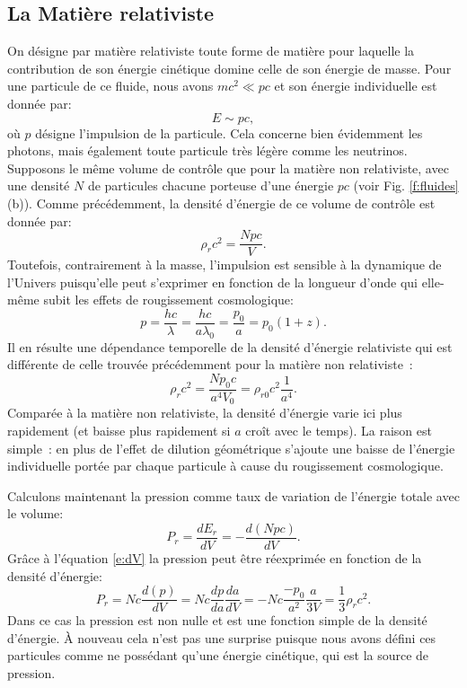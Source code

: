 \subsection{La Matière relativiste}
On désigne par matière relativiste toute forme de matière pour laquelle la contribution de son énergie cinétique domine celle de son énergie de masse. Pour une particule de ce fluide, nous avons $mc^2\ll pc$ et son énergie individuelle est donnée par:
\begin{equation}
E\sim pc,
\end{equation}
où $p$ désigne l'impulsion de la particule. Cela concerne bien évidemment les photons, mais également toute particule très légère comme les neutrinos. Supposons le même volume de contrôle que pour la matière non relativiste, avec une densité $N$ de particules chacune porteuse d'une énergie $pc$ (voir Fig. \ref{f:fluides} (b)). Comme précédemment, la densité d'énergie de ce volume de contrôle est donnée par:
\begin{equation}
\rho_rc^2=\frac{Npc}{V}.
\end{equation}
Toutefois, contrairement à la masse, l'impulsion est sensible à la dynamique de l'Univers puisqu'elle peut s'exprimer en fonction de la longueur d'onde qui elle-même subit les effets de rougissement cosmologique:
\begin{equation}
p=\frac{hc}{\lambda}=\frac{hc}{a\lambda_0}=\frac{p_0}{a}=p_0(1+z).
\end{equation}
Il en résulte une dépendance temporelle de la densité d'énergie relativiste qui est différente de celle trouvée précédemment pour la matière non relativiste~:
\begin{equation}
\rho_rc^2=\frac{Np_0c}{ a^4 V_0}=\rho_{r0}c^2\frac{1}{a^4}.
\end{equation}
Comparée à la matière non relativiste, la densité d'énergie varie ici plus rapidement (et baisse plus rapidement si $a$ croît avec le temps). La raison est simple~: en plus de l'effet de dilution géométrique s'ajoute une baisse de l'énergie individuelle portée par chaque particule à cause du rougissement cosmologique.

Calculons maintenant la pression  comme taux de variation de l'énergie totale avec le volume:
\begin{equation}
P_r=\frac{dE_r}{dV}=-\frac{d(Npc)}{dV}.
\end{equation}
Grâce à l'équation \ref{e:dV} la pression peut être réexprimée en fonction de la densité d'énergie:
\begin{equation}
P_r=Nc\frac{d(p)}{dV}=Nc\frac{dp}{da}\frac{da}{dV}=-Nc\frac{-p_0}{a^2}\frac{a}{3V}=\frac{1}{3}\rho_rc^2.
\end{equation}
Dans ce cas la pression est non nulle et est une fonction simple de la densité d'énergie. À nouveau cela n'est pas une surprise puisque nous avons défini ces particules comme ne possédant qu'une énergie cinétique, qui est la source de pression.

